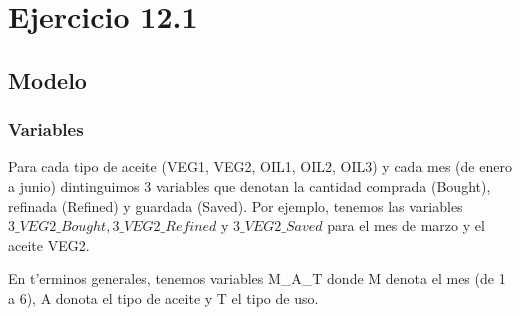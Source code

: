 \section{Ejercicio 12.1}
\subsection{Modelo}
\subsubsection{Variables}
Para cada tipo de aceite (VEG1, VEG2, OIL1, OIL2, OIL3) y cada mes (de enero a junio) dintinguimos 3 variables que denotan la cantidad comprada (Bought), refinada (Refined) y guardada (Saved). Por ejemplo, tenemos las variables $3\_VEG2\_Bought, 3\_VEG2\_Refined$ y $3\_VEG2\_Saved$ para el mes de marzo y el aceite VEG2.

En t'erminos generales, tenemos variables M\_A\_T donde M denota el mes (de 1 a 6), A donota el tipo de aceite y T el tipo de uso. 
